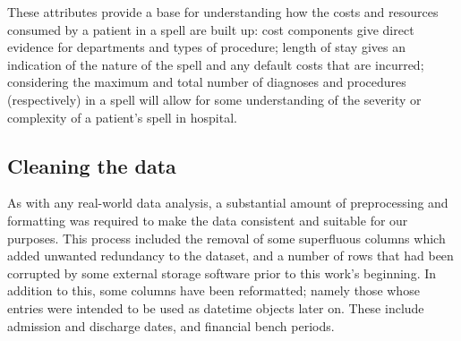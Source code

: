 These attributes provide a base for understanding how the costs and resources
consumed by a patient in a spell are built up: cost components give direct
evidence for departments and types of procedure; length of stay gives an
indication of the nature of the spell and any default costs that are incurred;
considering the maximum and total number of diagnoses and procedures
(respectively) in a spell will allow for some understanding of the severity or
complexity of a patient's spell in hospital.

\subsection{Cleaning the data}\label{subsec:formatting}

As with any real-world data analysis, a substantial amount of preprocessing and
formatting was required to make the data consistent and suitable for our
purposes. This process included the removal of some superfluous columns which
added unwanted redundancy to the dataset, and a number of rows that had been
corrupted by some external storage software prior to this work's beginning. In
addition to this, some columns have been reformatted; namely those whose entries
were intended to be used as datetime objects later on. These include admission
and discharge dates, and financial bench periods.
